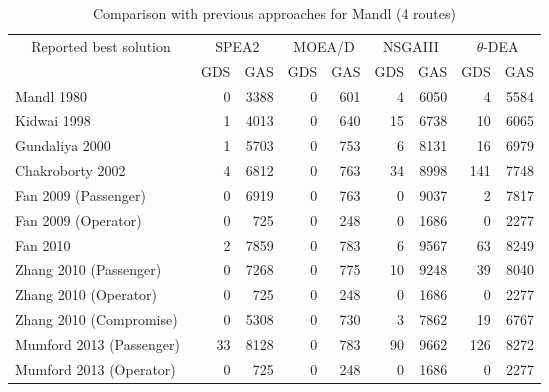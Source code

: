 \begin{table}[!htbp]
	\centering
	\caption{Comparison with previous approaches for Mandl (4 routes)}
	\begin{tabular}{|l|r|r||r|r||r|r||r|r|}
		\hline
		\multicolumn{1}{|c|}{\multirow{2}[4]{*}{Reported best solution}} & \multicolumn{2}{c||}{SPEA2} & \multicolumn{2}{c||}{MOEA/D} & \multicolumn{2}{c||}{NSGAIII} & \multicolumn{2}{c|}{$\theta$-DEA} \\
		\cline{2-9}    \multicolumn{1}{|c|}{} & \multicolumn{1}{c|}{GDS} & \multicolumn{1}{c||}{GAS} & \multicolumn{1}{c|}{GDS} & \multicolumn{1}{c||}{GAS} & \multicolumn{1}{c|}{GDS} & \multicolumn{1}{c||}{GAS} & \multicolumn{1}{c|}{GDS} & \multicolumn{1}{c|}{GAS} \\
		\hline
		Mandl 1980~\cite{mandl1980evaluation} & 0     & 3388  & 0     & 601   & 4     & 6050  & 4     & 5584 \\
		\hline
		Kidwai 1998~\cite{kidwai1998optimal} & 1     & 4013  & 0     & 640   & 15    & 6738  & 10    & 6065 \\
		\hline
		Gundaliya 2000~\cite{gundaliya2000model} & 1     & 5703  & 0     & 753   & 6     & 8131  & 16    & 6979 \\
		\hline
		Chakroborty 2002~\cite{chakroborty2002optimal} & 4     & 6812  & 0     & 763   & 34    & 8998  & 141   & 7748 \\
		\hline
		Fan 2009 (Passenger)~\cite{fan2009simple} & 0     & 6919  & 0     & 763   & 0     & 9037  & 2     & 7817 \\
		\hline
		Fan 2009 (Operator)~\cite{fan2009simple} & 0     & 725   & 0     & 248   & 0     & 1686  & 0     & 2277 \\
		\hline
		Fan 2010~\cite{fan2010metaheuristic} & 2     & 7859  & 0     & 783   & 6     & 9567  & 63    & 8249 \\
		\hline
		Zhang 2010 (Passenger)~\cite{zhang2010multi} & 0     & 7268  & 0     & 775   & 10    & 9248  & 39    & 8040 \\
		\hline
		Zhang 2010 (Operator)~\cite{zhang2010multi} & 0     & 725   & 0     & 248   & 0     & 1686  & 0     & 2277 \\
		\hline
		Zhang 2010 (Compromise)~\cite{zhang2010multi} & 0     & 5308  & 0     & 730   & 3     & 7862  & 19    & 6767 \\
		\hline
		Mumford 2013 (Passenger)~\cite{mumford2013new} & 33    & 8128  & 0     & 783   & 90    & 9662  & 126   & 8272 \\
		\hline
		Mumford 2013 (Operator)~\cite{mumford2013new} & 0     & 725   & 0     & 248   & 0     & 1686  & 0     & 2277 \\

\end{tabular}
\end{table}
